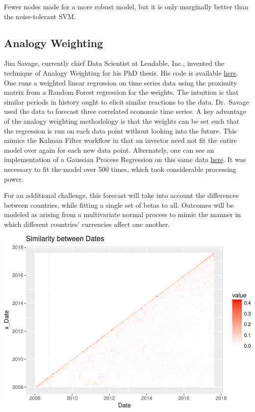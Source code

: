 \documentclass[]{article}
\begin{document}
Fewer nodes made for a more robust model, but it is only marginally
better than the noise-tolerant SVM.

\subsection{Analogy Weighting}\label{analogy-weighting}

Jim Savage, currently chief Data Scientist at Lendable, Inc., invented
the technique of Analogy Weighting for his PhD thesis. His code is
available \href{https://github.com/khakieconomics/Thesis_work}{here}.
One runs a weighted linear regression on time series data using the
proximity matrix from a Random Forest regression for the weights. The
intuition is that similar periods in history ought to elicit similar
reactions to the data. Dr.~Savage used the data to forecast three
correlated economic time series. A key advantage of the analogy
weighting methodology is that the weights can be set such that the
regression is run on each data point without looking into the future.
This mimics the Kalman Filter workflow in that an investor need not fit
the entire model over again for each new data point. Alternately, one
can see an implementation of a Gaussian Process Regression on this same
data \href{https://charlesnaylor.github.io/gp_regression/}{here}. It was
necessary to fit the model over 500 times, which took considerable
processing power.

For an additional challenge, this forecast will take into account the
differences between countries, while fitting a single set of betas to
all. Outcomes will be modeled as arising from a multivariate normal
process to mimic the manner in which different countries' currencies
affect one another.

\includegraphics{Econometric_FX_Forecasting_files/figure-latex/proxmat-1.pdf}
\end{document}
